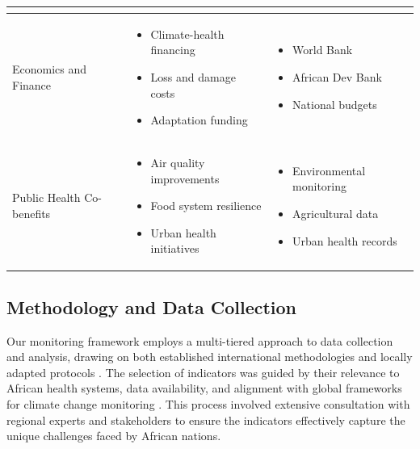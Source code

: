 \begin{table}[t]
\begin{tabularx}{\textwidth}{@{}p{4.5cm}X p{4.5cm}@{}}
\begin{itemize}[nosep,leftmargin=*]
\end{itemize} \\
\midrule
Economics and Finance & 
\begin{itemize}[nosep,leftmargin=*]
\item Climate-health financing
\item Loss and damage costs
\item Adaptation funding
\end{itemize} & 
\begin{itemize}[nosep,leftmargin=*]
\item World Bank
\item African Dev Bank
\item National budgets
\end{itemize} \\
\midrule
Public Health Co-benefits & 
\begin{itemize}[nosep,leftmargin=*]
\item Air quality improvements
\item Food system resilience
\item Urban health initiatives
\end{itemize} & 
\begin{itemize}[nosep,leftmargin=*]
\item Environmental monitoring
\item Agricultural data
\item Urban health records
\end{itemize} \\
\bottomrule
\end{tabularx}
\vspace{1ex}
\end{table}

\subsection{Methodology and Data Collection}
Our monitoring framework employs a multi-tiered approach to data collection and analysis, drawing on both established international methodologies and locally adapted protocols \citep{who2023climate}. The selection of indicators was guided by their relevance to African health systems, data availability, and alignment with global frameworks for climate change monitoring \citep{who2024data}. This process involved extensive consultation with regional experts and stakeholders to ensure the indicators effectively capture the unique challenges faced by African nations.

